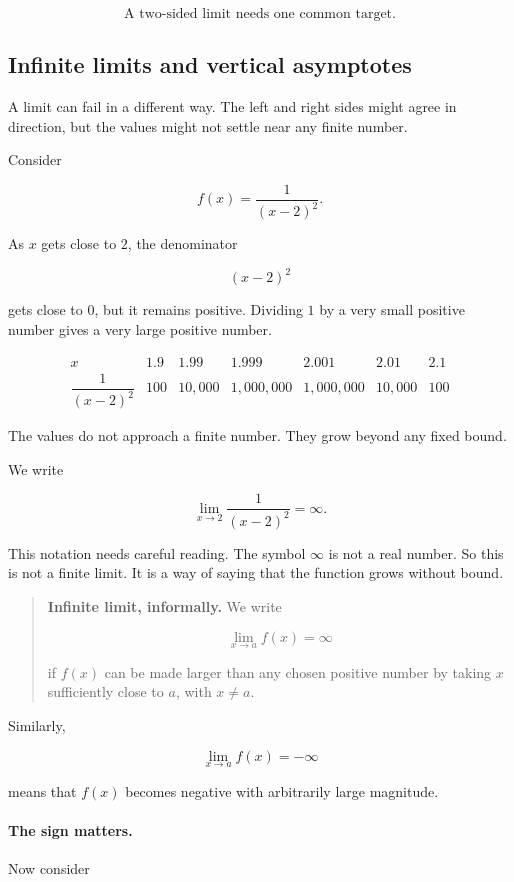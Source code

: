 \[
\boxed{\text{A two-sided limit needs one common target.}}
\]

\subsection{Infinite limits and vertical asymptotes}
\label{subsec:infinite-limits-vertical-asymptotes}

A limit can fail in a different way.  The left and right sides might agree in direction, but the values might not settle near any finite number.

Consider

\[
f(x)=\frac{1}{(x-2)^2}.
\]

As \(x\) gets close to \(2\), the denominator

\[
(x-2)^2
\]

gets close to \(0\), but it remains positive.  Dividing \(1\) by a very small positive number gives a very large positive number.

\[
\begin{array}{c|cccccc}
x & 1.9 & 1.99 & 1.999 & 2.001 & 2.01 & 2.1 \\ \hline
\dfrac{1}{(x-2)^2} & 100 & 10{,}000 & 1{,}000{,}000
& 1{,}000{,}000 & 10{,}000 & 100
\end{array}
\]

The values do not approach a finite number.  They grow beyond any fixed bound.

We write

\[
\lim_{x\to2}\frac{1}{(x-2)^2}=\infty.
\]

This notation needs careful reading.  The symbol \(\infty\) is not a real number.  So this is not a finite limit.  It is a way of saying that the function grows without bound.

\begin{quote}
\textbf{Infinite limit, informally.}
We write

\[
\lim_{x\to a}f(x)=\infty
\]

if \(f(x)\) can be made larger than any chosen positive number by taking \(x\) sufficiently close to \(a\), with \(x\neq a\).
\end{quote}

Similarly,

\[
\lim_{x\to a}f(x)=-\infty
\]

means that \(f(x)\) becomes negative with arbitrarily large magnitude.

\paragraph{The sign matters.}
Now consider

